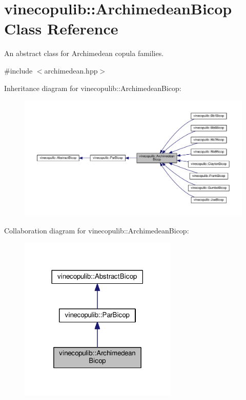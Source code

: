 \hypertarget{classvinecopulib_1_1_archimedean_bicop}{}\section{vinecopulib\+:\+:Archimedean\+Bicop Class Reference}
\label{classvinecopulib_1_1_archimedean_bicop}


An abstract class for Archimedean copula families.  




{\ttfamily \#include $<$archimedean.\+hpp$>$}



Inheritance diagram for vinecopulib\+:\+:Archimedean\+Bicop\+:
\nopagebreak
\begin{figure}[H]
\begin{center}
\leavevmode
\includegraphics[width=350pt]{classvinecopulib_1_1_archimedean_bicop__inherit__graph}
\end{center}
\end{figure}


Collaboration diagram for vinecopulib\+:\+:Archimedean\+Bicop\+:
\nopagebreak
\begin{figure}[H]
\begin{center}
\leavevmode
\includegraphics[width=213pt]{classvinecopulib_1_1_archimedean_bicop__coll__graph}
\end{center}
\end{figure}
